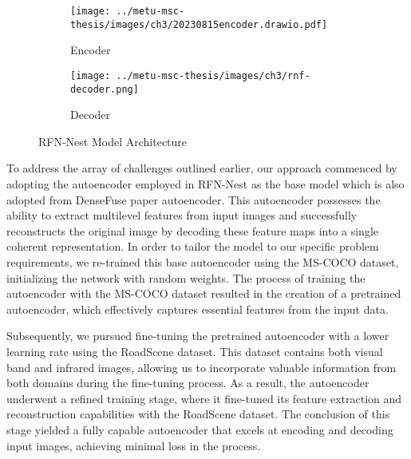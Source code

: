 \begin{figure}[htbp]
    \centering
    \begin{subfigure}[b]{\textwidth}
        \centering
        \texttt{[image: ../metu-msc-thesis/images/ch3/20230815encoder.drawio.pdf]}
        \caption{Encoder}
        \label{fig:ch3:encoder}
    \end{subfigure}
    \vspace{0.01cm}
    \begin{subfigure}[b]{\textwidth}
        \centering
        \texttt{[image: ../metu-msc-thesis/images/ch3/rnf-decoder.png]}
        \caption{Decoder}
        \label{fig:ch3:rfnnest:decoder}
    \end{subfigure}
    \caption{RFN-Nest Model Architecture\cite{li2021rfn}}
    \label{fig:ch3:rfnnest}
\end{figure}

To address the array of challenges outlined earlier, our approach commenced by adopting the autoencoder employed in RFN-Nest \cite{li2021rfn} as the base model which is also adopted from DenseFuse \cite{li2019infrared} paper autoencoder. This autoencoder possesses the ability to extract multilevel features from input images and successfully reconstructs the original image by decoding these feature maps into a single coherent representation. In order to tailor the model to our specific problem requirements, we re-trained this base autoencoder using the MS-COCO \cite{lin2014microsoft} dataset, initializing the network with random weights. The process of training the autoencoder with the MS-COCO dataset resulted in the creation of a pretrained autoencoder, which effectively captures essential features from the input data.

Subsequently, we pursued fine-tuning the pretrained autoencoder with a lower learning rate using the RoadScene \cite{xu2020aaai} dataset. This dataset contains both visual band and infrared images, allowing us to incorporate valuable information from both domains during the fine-tuning process. As a result, the autoencoder underwent a refined training stage, where it fine-tuned its feature extraction and reconstruction capabilities with the RoadScene dataset. The conclusion of this stage yielded a fully capable autoencoder that excels at encoding and decoding input images, achieving minimal loss in the process.

